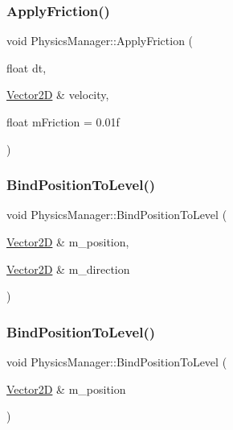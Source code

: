 \subsubsection{\texorpdfstring{Apply\+Friction()}{ApplyFriction()}}
{\footnotesize\ttfamily void Physics\+Manager\+::\+Apply\+Friction (\begin{DoxyParamCaption}\item[{float}]{dt,  }\item[{\hyperlink{class_vector2_d}{Vector2D} \&}]{velocity,  }\item[{float}]{m\+Friction = {\ttfamily 0.01f} }\end{DoxyParamCaption})\hspace{0.3cm}{\ttfamily [static]}}

\hypertarget{class_physics_manager_a75bfca00399793e604bcd749fa97c4ba}{}\label{class_physics_manager_a75bfca00399793e604bcd749fa97c4ba} 
\subsubsection{\texorpdfstring{Bind\+Position\+To\+Level()}{BindPositionToLevel()}\hspace{0.1cm}{\footnotesize\ttfamily [1/2]}}
{\footnotesize\ttfamily void Physics\+Manager\+::\+Bind\+Position\+To\+Level (\begin{DoxyParamCaption}\item[{\hyperlink{class_vector2_d}{Vector2D} \&}]{m\+\_\+position,  }\item[{\hyperlink{class_vector2_d}{Vector2D} \&}]{m\+\_\+direction }\end{DoxyParamCaption})\hspace{0.3cm}{\ttfamily [static]}}

\hypertarget{class_physics_manager_a8938f25d68d5e102f806ce7277814079}{}\label{class_physics_manager_a8938f25d68d5e102f806ce7277814079} 
\subsubsection{\texorpdfstring{Bind\+Position\+To\+Level()}{BindPositionToLevel()}\hspace{0.1cm}{\footnotesize\ttfamily [2/2]}}
{\footnotesize\ttfamily void Physics\+Manager\+::\+Bind\+Position\+To\+Level (\begin{DoxyParamCaption}\item[{\hyperlink{class_vector2_d}{Vector2D} \&}]{m\+\_\+position }\end{DoxyParamCaption})\hspace{0.3cm}{\ttfamily [static]}}

